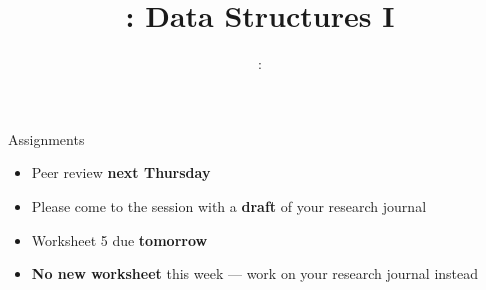 \usepackage{../../beamerthemeFalmouthGamesAcademy}
\usepackage{multimedia}
\graphicspath{ {../../} }

\lstset{language=Python
}

\usepackage[normalem]{ulem}
\usepackage{wasysym}

\usepackage{algpseudocode}

\usepackage{pdfpages}
\usepackage{qtree}

\usetikzlibrary{arrows,automata}
\usetikzlibrary{tikzmark,calc}




\title{\sessionnumber: Data Structures I}
\subtitle{\modulecode: \moduletitle}

\frame{\titlepage} 


\begin{frame}{Assignments}
	\begin{itemize}
		\item Peer review \textbf{next Thursday}
		\item Please come to the session with a \textbf{draft} of your research journal
	\end{itemize}
	\vspace{3ex}
	\begin{itemize}
		\item Worksheet 5 due \textbf{tomorrow}
		\item \textbf{No new worksheet} this week --- work on your research journal instead
	\end{itemize}
\end{frame}








